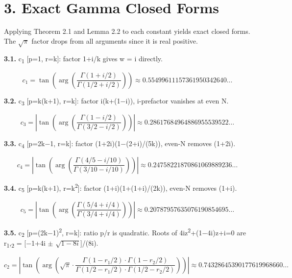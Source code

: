 \documentclass[11pt]{article}
\begin{document}
\hypertarget{exact-gamma-closed-forms}{%
\section{3. Exact Gamma Closed Forms}\label{exact-gamma-closed-forms}}

Applying Theorem 2.1 and Lemma 2.2 to each constant yields exact closed
forms. The \(\sqrt{\pi}\) factor drops from all arguments since it is
real positive.

\textbf{3.1.} c\textsubscript{1} {[}p=1, r=k{]}: factor 1+i/k gives w =
i directly.

\[c_1 = \tan\!\left(\arg\!\left(\frac{\Gamma(1+i/2)}{\Gamma(1/2+i/2)}\right)\right) \approx 0.55499611157361950342640\ldots\]

\textbf{3.2.} c\textsubscript{3} {[}p=k(k+1), r=k{]}: factor i(k+(1−i)),
i-prefactor vanishes at even N.

\[c_3 = \left|\tan\!\left(\arg\!\left(\frac{\Gamma(1-i/2)}{\Gamma(3/2-i/2)}\right)\right)\right| \approx 0.28617684964886955539522\ldots\]

\textbf{3.3.} c\textsubscript{4} {[}p=2k−1, r=k{]}: factor
(1+2i)(1−(2+i)/(5k)), even-N removes (1+2i).

\[c_4 = \left|\tan\!\left(\arg\!\left(\frac{\Gamma(4/5-i/10)}{\Gamma(3/10-i/10)}\right)\right)\right| \approx 0.24758221870861069889236\ldots\]

\textbf{3.4.} c\textsubscript{5} {[}p=k(k+1), r=k\textsuperscript{2}{]}:
factor (1+i)(1+(1+i)/(2k)), even-N removes (1+i).

\[c_5 = \left|\tan\!\left(\arg\!\left(\frac{\Gamma(5/4+i/4)}{\Gamma(3/4+i/4)}\right)\right)\right| \approx 0.20787957635076190854695\ldots\]

\textbf{3.5.} c\textsubscript{2} {[}p=(2k−1)\textsuperscript{2}, r=k{]}:
ratio p/r is quadratic. Roots of 4iz\textsuperscript{2}+(1−4i)z+i=0 are
r\textsubscript{1},\textsubscript{2} = {[}−1+4i \(\pm\)
\(\sqrt{1−8i}\){]}/(8i).

\[c_2 = \left|\tan\!\left(\arg\!\left(\sqrt{\pi} \cdot \frac{\Gamma(1-r_1/2)\cdot\Gamma(1-r_2/2)}{\Gamma(1/2-r_1/2)\cdot\Gamma(1/2-r_2/2)}\right)\right)\right| \approx 0.74328645390177619968660\ldots\]
\end{document}
